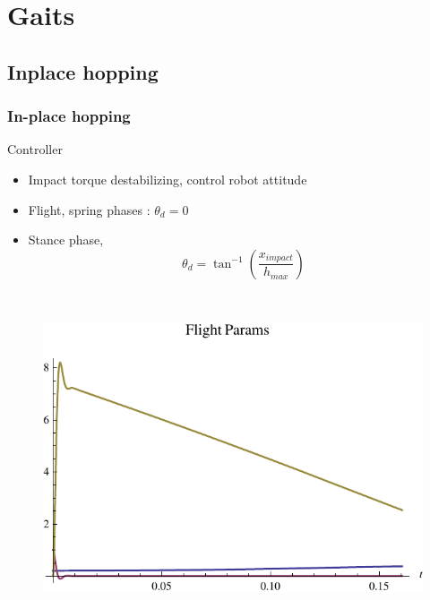 \section{Gaits}
\subsection*{Inplace hopping}
\begin{frame}
\frametitle{In-place hopping}
\begin{block}{Controller}
\begin{itemize}
  \item 
  Impact torque destabilizing, control robot attitude\\[0.1in]
  \item
  Flight, spring phases : $\theta_d = 0$\\[0.1in]
  \item
  Stance phase,
  \begin{equation*}
   \theta_d = \tan^{-1}\left(\frac{x_{impact}}{h_{max}}\right)
  \end{equation*}\\[0.1in]
\end{itemize}
  
  \begin{columns}
  \begin{figure}
  \centering
  \includegraphics[scale=0.45]{fig/inplace_pFlight_params.pdf}
  \end{figure}
  

\end{columns}
\end{block}
\end{frame}
